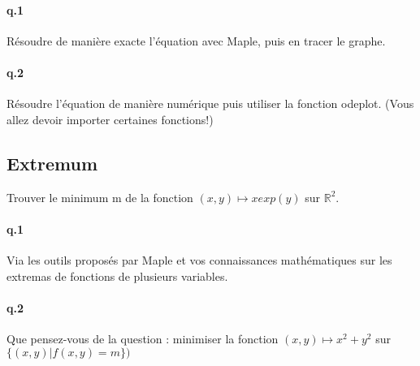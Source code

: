 \documentclass[10pt,a4paper]{article}
\begin{document}
\paragraph{q.1} Résoudre de manière exacte l’équation avec Maple, puis en tracer le graphe.
\paragraph{q.2} Résoudre l’équation de manière numérique puis
utiliser la fonction odeplot. (Vous allez devoir importer certaines
fonctions!)

\subsection{Extremum}
Trouver le minimum m de la fonction $(x,y)\mapsto xexp(y)$ sur $\mathbb{R}^2$.
\paragraph{q.1} Via les outils proposés par Maple et vos connaissances mathématiques sur les extremas de fonctions de plusieurs variables.
\paragraph{q.2}
Que pensez-vous de la question : minimiser la fonction $(x,y)\mapsto x^2+y^2$ sur $\{(x,y) | f(x,y)= m \})$
%
%
\end{document}
